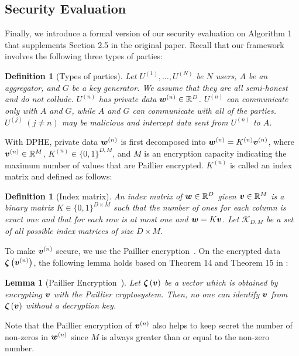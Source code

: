 \documentclass[10pt,twocolumn,letterpaper]{article}
\newtheorem{lemma}[theorem]{Lemma}
\newtheorem{definition}[theorem]{Definition}
\def\vct#1{\mbox{\boldmath $#1$}}
\def\ui#1{^{(#1)}}
\def\he#1{\vct{\zeta}\left(#1\right)}
\def\wui{\vct{w}\ui{n}}
\begin{document}
\subsection{Security Evaluation}
Finally, we introduce a formal version of our security evaluation on Algorithm 1 that supplements Section 2.5 in the original paper. Recall that our framework involves the following three types of parties:
\begin{definition}[Types of parties]
Let $U\ui{1},\dots,U\ui{N}$ be $N$ users, $A$ be an aggregator, and $G$ be a key generator. We assume that they are all semi-honest~\cite{OdedGoldreich2004} and do not collude. $U\ui{n}$ has private data $\wui\in\mathbb{R}^D$. $U\ui{n}$ can communicate only with $A$ and $G$, while $A$ and $G$ can communicate with all of the parties. $U\ui{j}\; (j\neq n)$ may be malicious and intercept data sent from $U\ui{n}$ to $A$.
\end{definition}

With DPHE, private data $\wui$ is first decomposed into $\wui=K\ui{n}\vct{v}\ui{n}$, where $\vct{v}\ui{n}\in\mathbb{R}^M$, $K\ui{n}\in\{0, 1\}^{D, M}$, and $M$ is an encryption capacity indicating the maximum number of values that are Paillier encrypted. $K\ui{n}$ is called an index matrix and defined as follows:
\begin{definition}[Index matrix]
An index matrix of $\vct{w}\in\mathbb{R}^D$ given $\vct{v}\in\mathbb{R}^M$ is a binary matrix $K\in\{0, 1\}^{D\times M}$ such that the number of ones for each column is exact one and that for each row is at most one and $\vct{w}=K\vct{v}$. Let $\mathcal{K}_{D, M}$ be a set of all possible index matrices of size $D\times M$. 
\label{def:ind}
\end{definition}
To make $\vct{v}\ui{n}$ secure, we use the Paillier encryption~\cite{Paillier1999a}. On the encrypted data $\he{\vct{v}\ui{n}}$, the following lemma holds based on Theorem 14 and Theorem 15 in \cite{Paillier1999a}:
\begin{lemma}[Paillier Encryption~\cite{Paillier1999a}]
Let $\he{\vct{v}}$ be a vector which is obtained by encrypting $\vct{v}$ with the Paillier cryptosystem. Then, no one can identify $\vct{v}$ from $\he{\vct{v}}$ without a decryption key.
\label{le:he}
\end{lemma}
Note that the Paillier encryption of $\vct{v}\ui{n}$ also helps to keep secret the number of non-zeros in $\wui$ since $M$ is always greater than or equal to the non-zero number.
\end{document}
